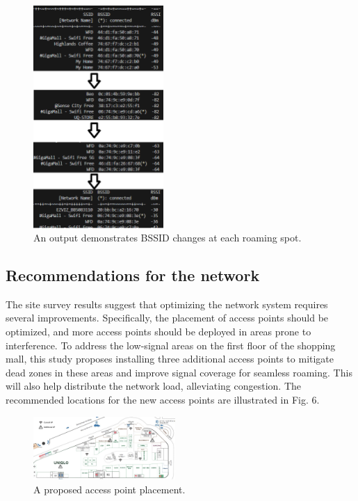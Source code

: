 \documentclass[conference]{IEEEtran}
\begin{document}
\begin{figure}[htbp]
    \centering
    \includegraphics[width=0.44\textwidth]{fig5_rssid_change.png}
    \caption{An output demonstrates BSSID changes at each roaming spot.}
\end{figure}

\subsection{Recommendations for the network}

The site survey results suggest that optimizing the network system requires several improvements. Specifically, the placement of access points should be optimized, and more access points should be deployed in areas prone to interference. To address the low-signal areas on the first floor of the shopping mall, this study proposes installing three additional access points to mitigate dead zones in these areas and improve signal coverage for seamless roaming. This will also help distribute the network load, alleviating congestion. The recommended locations for the new access points are illustrated in Fig. 6.

\begin{figure}[htbp]
    \centering
    \includegraphics[width=0.48\textwidth]{fig6_acesspoint_suggestion.png}
    \caption{A proposed access point placement.}
\end{figure}
\end{document}
